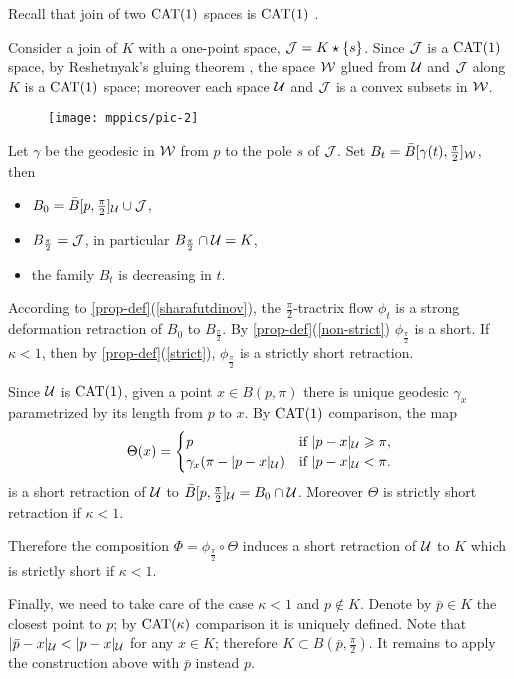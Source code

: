 \documentclass[oneside,a4paper, 12pt]{article}
\begin{document}
Recall that join of two $\mathrm{CAT}(1)$ spaces is $\mathrm{CAT}(1)$ \cite[Corollary 3.14]{bridson-haefliger}.

Consider a join of  $K$ with a one-point space, $\mathcal{J}=K\star \{s\}$.
Since $\mathcal{J}$ is a $\mathrm{CAT}(1)$ space,
by Reshetnyak's gluing theorem \cite[8.9.1]{akp}, the space $\mathcal{W}$ glued from ${\mathcal{U}}$ and $\mathcal{J}$ along $K$ is a $\mathrm{CAT}(1)$ space;
moreover each space ${\mathcal{U}}$ and $\mathcal{J}$ is a convex subsets in $\mathcal{W}$.

\begin{wrapfigure}{o}{50 mm}
\vskip-0mm
\centering
\texttt{[image: mppics/pic-2]}
\end{wrapfigure} 


Let $\gamma$ be the geodesic in $\mathcal{W}$ from $p$ to the pole $s$ of $\mathcal{J}$.
Set $B_t=\bar B[\gamma(t),\tfrac\pi2]_{\mathcal{W}}$, then
\begin{itemize}
\item $B_0=\bar B[p,\tfrac\pi2]_{\mathcal{U}}\cup \mathcal{J}$,
\item $B_{\frac\pi2}=\mathcal{J}$, in particular $B_{\frac\pi2}\cap \mathcal{U}=K$,
\item the family $B_t$ is decreasing in $t$.
\end{itemize}
According to \ref{prop-def}(\ref{sharafutdinov}), the $\tfrac\pi2$-tractrix flow $\phi_t$ is a strong deformation retraction of $B_0$ to $B_{\frac\pi2}$.
By \ref{prop-def}(\ref{non-strict}) $\phi_{\frac\pi2}$ is a short.
If $\kappa<1$, then by \ref{prop-def}(\ref{strict}), $\phi_{\frac\pi2}$ is a strictly short retraction.

Since ${\mathcal{U}}$ is $\mathrm{CAT}(1)$,
given a point $x\in B(p,\pi)$ there is unique geodesic $\gamma_x$ parametrized by its length from $p$ to $x$. 
By $\mathrm{CAT}(1)$ comparison, the map 
\[\Theta(x)=
\begin{cases}
p&\text{if\ }|p-x|_{\mathcal{U}}\geqslant \pi,
\\
\gamma_x(\pi-|p-x|_{\mathcal{U}})&\text{if\ }|p-x|_{\mathcal{U}}< \pi.
\end{cases}
\]
is a short retraction of ${\mathcal{U}}$ to $\bar B[p,\tfrac\pi2]_{\mathcal{U}}=B_0\cap \mathcal{U}$.
Moreover $\Theta$ is strictly short retraction if $\kappa<1$.

Therefore the composition $\Phi=\phi_{\frac\pi2}\circ\Theta$ induces a short retraction of ${\mathcal{U}}$ to $K$
which is strictly short if $\kappa<1$.

Finally, we need to take care of the case $\kappa<1$ and $p\notin K$.
Denote by $\bar p\in K$ the closest point to $p$; by $\mathrm{CAT}(\kappa)$ comparison it is uniquely defined.
Note that $|\bar p-x|_{\mathcal{U}}< |p-x|_{\mathcal{U}}$ for any $x\in K$;
therefore $K\subset B(\bar p,\tfrac\pi2)$. 
It remains to apply the construction above with $\bar p$ instead $p$.
\qeds
\end{document}
